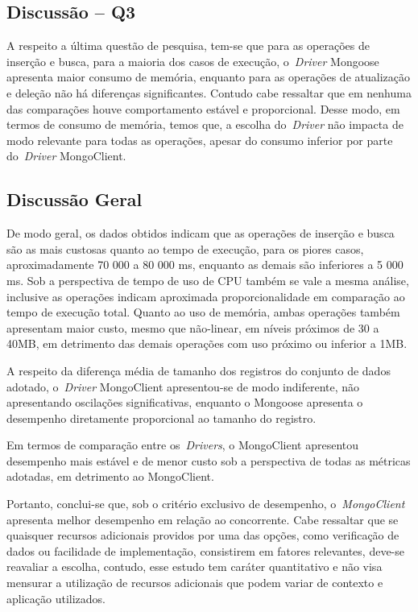 \documentclass[12pt]{article}
\begin{document}
\subsection{Discussão -- Q3}
\label{q3}

A respeito a última questão de pesquisa, tem-se que para as operações de inserção e busca, para a maioria dos casos de execução, o~\emph{Driver} Mongoose apresenta maior consumo de memória, enquanto para as operações de atualização e deleção não há diferenças significantes.
Contudo cabe ressaltar que em nenhuma das comparações houve comportamento estável e proporcional.
Desse modo, em termos de consumo de memória, temos que, a escolha do~\emph{Driver} não impacta de modo relevante para todas as operações, apesar do consumo inferior por parte do~\emph{Driver} MongoClient.

\subsection{Discussão Geral}
\label{qgeral}

De modo geral, os dados obtidos indicam que as operações de inserção e busca são as mais custosas quanto ao tempo de execução, para os piores casos, aproximadamente 70 000 a 80 000 ms, enquanto as demais são inferiores a 5 000 ms.
Sob a perspectiva de tempo de uso de CPU também se vale a mesma análise, inclusive as operações indicam aproximada proporcionalidade em comparação ao tempo de execução total.
Quanto ao uso de memória, ambas operações também apresentam maior custo, mesmo que não-linear, em níveis próximos de 30 a 40MB, em detrimento das demais operações com uso próximo ou inferior a 1MB.

A respeito da diferença média de tamanho dos registros do conjunto de dados adotado, o~\emph{Driver} MongoClient apresentou-se de modo indiferente, não apresentando oscilações significativas, enquanto o Mongoose apresenta o desempenho diretamente proporcional ao tamanho do registro.

Em termos de comparação entre os~\emph{Drivers}, o MongoClient apresentou desempenho mais estável e de menor custo sob a perspectiva de todas as métricas adotadas, em detrimento ao MongoClient.

Portanto, conclui-se que, sob o critério exclusivo de desempenho, o~\emph{MongoClient} apresenta melhor desempenho em relação ao concorrente.
Cabe ressaltar que se quaisquer recursos adicionais providos por uma das opções, como verificação de dados ou facilidade de implementação, consistirem em fatores relevantes, deve-se reavaliar a escolha, contudo, esse estudo tem caráter quantitativo e não visa mensurar a utilização de recursos adicionais que podem variar de contexto e aplicação utilizados.
\end{document}
